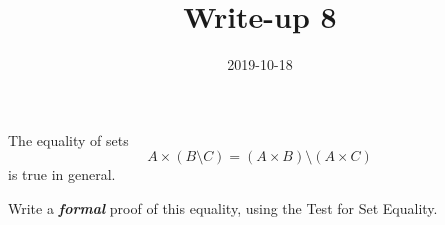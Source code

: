 \documentclass[a4paper,12pt]{article}
\title{Write-up 8}
\date{2019-10-18}
\begin{document}
	\begin{problem}
		The equality of sets \[A \times (B \setminus C) = (A \times B) \setminus (A \times C)\] is true in general.
		
		Write a \textbf{\textit{formal}} proof of this equality, using the Test for Set Equality.	
	\end{problem}
	\begin{answer}
		
	\end{answer}
\end{document}
